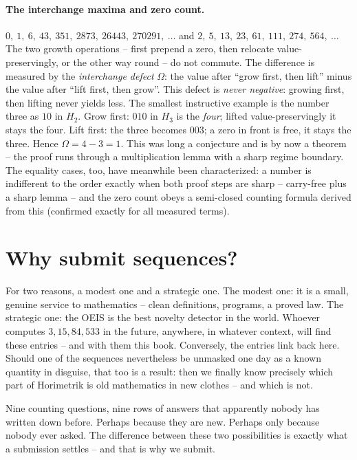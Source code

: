 \paragraph{The interchange maxima and zero count.}
$0,\ 1,\ 6,\ 43,\ 351,\ 2873,\ 26443,\ 270291,\ \ldots$ and
$2,\ 5,\ 13,\ 23,\ 61,\ 111,\ 274,\ 564,\ \ldots$
The two growth operations -- first prepend a zero, then relocate
value-preservingly, or the other way round -- do not commute. The
difference is measured by the \emph{interchange defect} $\Omega$:
the value after ``grow first, then lift'' minus the value after
``lift first, then grow''. This defect is \emph{never negative}:
growing first, then lifting never yields less. The smallest
instructive example is the number three as $10$ in $H_2$. Grow
first: $010$ in $H_3$ is the \emph{four}; lifted
value-preservingly it stays the four. Lift first: the three
becomes $003$; a zero in front is free, it stays the three. Hence
$\Omega=4-3=1$. This was long a conjecture and is by now a theorem
-- the proof runs through a multiplication lemma with a sharp
regime boundary. The equality cases, too, have meanwhile been
characterized: a number is indifferent to the order exactly when
both proof steps are sharp -- carry-free plus a sharp lemma -- and
the zero count obeys a semi-closed counting formula derived from
this (confirmed exactly for all measured terms).

\section{Why submit sequences?}

For two reasons, a modest one and a strategic one. The modest one:
it is a small, genuine service to mathematics -- clean
definitions, programs, a proved law. The strategic one: the OEIS
is the best novelty detector in the world. Whoever computes
$3, 15, 84, 533$ in the future, anywhere, in whatever context,
will find these entries -- and with them this book. Conversely,
the entries link back here. Should one of the sequences
nevertheless be unmasked one day as a known quantity in disguise,
that too is a result: then we finally know precisely which part of
Horimetrik is old mathematics in new clothes -- and which is not.

\begin{oberflaeche}
Nine counting questions, nine rows of answers that apparently
nobody has written down before. Perhaps because they are new.
Perhaps only because nobody ever asked. The difference between
these two possibilities is exactly what a submission settles --
and that is why we submit.
\end{oberflaeche}
